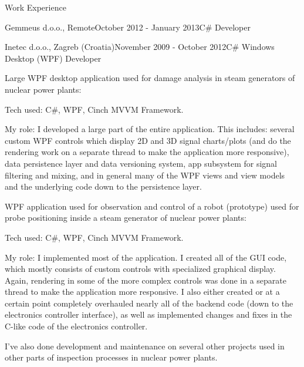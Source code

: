 \documentclass{resume}
\begin{document}
\begin{rSection}{Work Experience}
\begin{rSubsection}{Gemmeus d.o.o., Remote}{October 2012 - January 2013}{C\# Developer}{}
\end{rSubsection}

\vspace{2.0em}

\begin{rSubsection}{Inetec d.o.o., Zagreb (Croatia)}{November 2009 - October 2012}{C\# Windows Desktop (WPF) Developer}{}

Large WPF desktop application used for damage analysis in steam generators of nuclear power plants:

\begin{rList}
\item Tech used: C\#, WPF, Cinch MVVM Framework.
\item My role: I developed a large part of the entire application. This includes: several custom WPF controls which display 2D and 3D signal charts/plots (and do the rendering work on a separate thread to make the application more responsive), data persistence layer and data versioning system, app subsystem for signal filtering and mixing, and in general many of the WPF views and view models and the underlying code down to the persistence layer.
\end{rList}

WPF application used for observation and control of a robot (prototype) used for probe positioning inside a steam generator of nuclear power plants:

\begin{rList}
\item Tech used: C\#, WPF, Cinch MVVM Framework.
\item My role: I implemented most of the application. I created all of the GUI code, which mostly consists of custom controls with specialized graphical display. Again, rendering in some of the more complex controls was done in a separate thread to make the application more responsive. I also either created or at a certain point completely overhauled nearly all of the backend code (down to the electronics controller interface), as well as implemented changes and fixes in the C-like code of the electronics controller.
\end{rList}

I've also done development and maintenance on several other projects used in other parts of inspection processes in nuclear power plants.

\end{rSubsection}

\vspace{2.0em}


\end{rSection}
\end{document}
